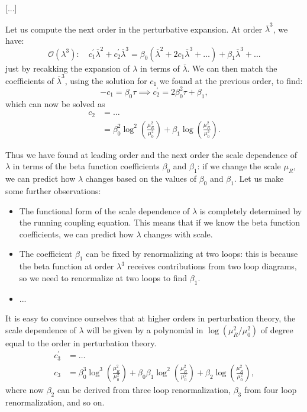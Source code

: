     [...]

Let us compute the next order in the perturbative expansion. At order \(\overline{\lambda}^3\), we have:
\[
    \mathcal{O}(\lambda^3): \quad c_1^{\prime} \overline{\lambda}^2 + c_2^{\prime} \overline{\lambda}^3 = \beta_0 \left( \overline{\lambda}^2 + 2 c_1 \overline{\lambda}^3 + \dots \right) + \beta_1 \overline{\lambda}^3 + \dots
\]
just by recakking the expansion of \(\lambda\) in terms of \(\overline{\lambda}\). We can then match the coefficients of \(\overline{\lambda}^3\), using the solution for \(c_1\) we found at the previous order, to find:
\[
    - c_1 = \beta_0 \tau \implies c_2^{\prime} = 2 \beta_0^2 \tau + \beta_1,
\]
which can now be solved as
\[
    \begin{aligned}
        c_2 & = \dots                                                                              \\
            & = \beta_0^2 \log^2(\frac{\mu_R^2}{\mu_0^2}) + \beta_1 \log(\frac{\mu_R^2}{\mu_0^2}).
    \end{aligned}
\]

Thus we have found at leading order and the next order the scale dependence of \(\lambda\) in terms of the beta function coefficients \(\beta_0\) and \(\beta_1\): if we change the scale \(\mu_R\), we can predict how \(\lambda\) changes based on the values of \(\beta_0\) and \(\beta_1\). Let us make some further observations:
\begin{itemize}
    \item The functional form of the scale dependence of \(\lambda\) is completely determined by the running coupling equation. This means that if we know the beta function coefficients, we can predict how \(\lambda\) changes with scale.
    \item The coefficient \(\beta_1\) can be fixed by renormalizing at two loops: this is because the beta function at order \(\lambda^3\) receives contributions from two loop diagrams, so we need to renormalize at two loops to find \(\beta_1\).
    \item ...
\end{itemize}

It is easy to convince ourselves that at higher orders in perturbation theory, the scale dependence of \(\lambda\) will be given by a polynomial in \(\log(\mu_R^2/\mu_0^2)\) of degree equal to the order in perturbation theory.
\[
    \begin{aligned}
        c^{\prime}_3 & = \dots                                                                                                                                \\
        c_3          & = \beta_0^3 \log^3(\frac{\mu_R^2}{\mu_0^2}) + \beta_0 \beta_1 \log^2(\frac{\mu_R^2}{\mu_0^2}) + \beta_2 \log(\frac{\mu_R^2}{\mu_0^2}),
    \end{aligned}
\]
where now \(\beta_2\) can be derived from three loop renormalization, \(\beta_3\) from four loop renormalization, and so on.

